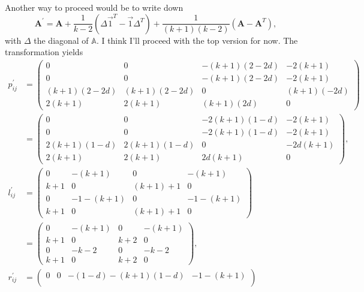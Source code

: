 \documentclass[13pt]{amsart}
\begin{document}
Another way to proceed would be to write down
\begin{equation}
    \mathbf{A}^\prime = \mathbf{A} + \frac{1}{k-2} (\Delta \vec{1}^T - \vec{1} \Delta^T) + \frac{1}{(k+1)(k-2)}(\mathbf{A} - \mathbf{A}^T),
\end{equation}
with $\Delta$ the diagonal of $\mathbb{A}$.
I think I'll proceed with the top version for now.
The transformation yields
\begin{equation}
    \begin{split}
        p^\prime_{ij} &=
        \begin{pmatrix}
            0 & 0 & -(k+1)(2 - 2d) & -2(k+1) \\
            0 & 0 & -(k+1)(2 - 2d) & -2(k+1) \\
            (k+1)(2 - 2d) & (k+1)(2 - 2d) & 0 & (k+1)(- 2d) \\
            2(k+1) & 2(k+1) & (k+1)(2d) & 0
        \end{pmatrix}
        \\
        & =
        \begin{pmatrix}
            0 & 0 & -2(k+1)(1-d) & -2(k+1) \\
            0 & 0 & -2(k+1)(1-d) & -2(k+1) \\
            2(k+1)(1-d) & 2(k+1)(1-d) & 0 & -2d(k+1) \\
            2(k+1) & 2(k+1) & 2d(k+1) & 0
        \end{pmatrix},
        \\
        l^\prime_{ij} & =
        \begin{pmatrix}
            0 & -(k+1) & 0 & -(k+1) \\
            k+1 & 0 & (k+1) + 1 & 0 \\
            0 & -1 - (k+1) & 0 & -1 - (k+1) \\
            k+1 & 0 & (k+1) + 1 & 0
        \end{pmatrix}
        \\
        & =
        \begin{pmatrix}
            0 & -(k+1) & 0 & -(k+1) \\
            k+1 & 0 & k+2 & 0 \\
            0 & -k-2 & 0 & -k-2 \\
            k+1 & 0 & k+2 & 0
        \end{pmatrix},
        \\
        r^\prime_{ij} & =
        \begin{pmatrix}
            0 & 0 & -(1-d) - (k+1)(1-d) & -1 - (k+1) \\

\end{pmatrix}
\end{split}
\end{equation}
\end{document}
